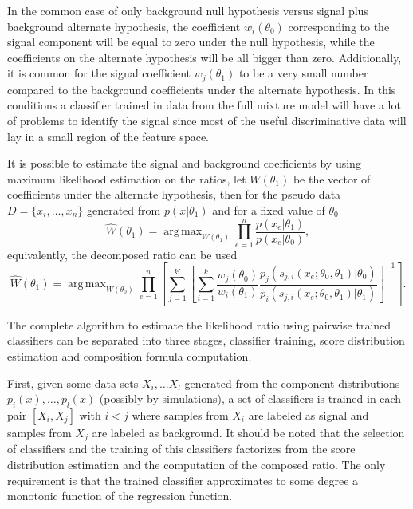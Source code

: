 \documentclass[11pt, oneside]{article}   	%
\DeclareMathOperator*{\argmax}{arg\,max}
\begin{document}
In the common case of only background null hypothesis versus signal plus background alternate hypothesis, the coefficient $w_{i}(\theta_0)$ corresponding to the signal component will be equal to zero under the null hypothesis, while the coefficients on the alternate hypothesis will be all bigger than zero. Additionally, it is common for the signal coefficient $w_{j}(\theta_1)$ to be a very small number compared to the background coefficients under the alternate hypothesis. In this conditions a classifier trained in data from the full mixture model will have a lot of problems to identify the signal since most of the useful discriminative data will lay in a small region of the feature space.

It is possible to estimate the signal and background coefficients by using maximum likelihood estimation on the ratios, let $W(\theta_1)$ be the vector of coefficients under the alternate hypothesis, then for the pseudo data $D=\{x_i, \dots, x_n\}$ generated from $p(x| \theta_1)$ and for a fixed value of $\theta_0$ 
\begin{equation}
\hat{W}(\theta_1) = \argmax_{W(\theta_1)} \prod_{e=1}^n \frac{p(x_e | \theta_1)}{p(x_e| \theta_0)} ,
\end{equation}
equivalently, the decomposed ratio can be used
\begin{equation}\label{eq:fitting}
\hat{W}(\theta_1) = \argmax_{W(\theta_0)} \prod_{e=1}^n \left[ \sum_{j=1}^{k'} \left[ \sum_{i=1}^k \frac{ w_{j}(\theta_0)}{w_i(\theta_1)} \frac{ p_{j}(s_{j,i}(x_e;\theta_0, \theta_1)|\theta_0)}{  p_i(s_{j,i}(x_e;\theta_0, \theta_1)| \theta_1)}  \right]^{-1}\right].
\end{equation}

The complete algorithm to estimate the likelihood ratio using pairwise trained classifiers can be separated into three stages, classifier training, score distribution estimation and composition formula computation. 

First, given some data sets $X_i, \dots X_l$ generated from the component distributions 
$p_i(x), \dots, p_l(x)$ (possibly by simulations), a set of classifiers is trained in each pair $[X_i, X_j]$ with $i < j$ where samples from $X_i$ are labeled as signal and samples from $X_j$ are labeled as background. It should be noted that the selection of classifiers and the training of this classifiers factorizes from the score distribution estimation and the computation of the composed ratio. The only requirement is that the trained classifier approximates to some degree a monotonic function of the regression function. 
\end{document}

